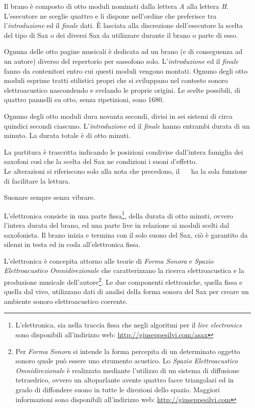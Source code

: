 \documentclass[10pt, a4paper, twoside]{book}
\begin{document}
\begin{multicols}{2}

Il brano è composto di otto moduli nominati dalla lettera \emph{A} alla lettera \emph{H}. L'esecutore ne sceglie quattro e li dispone nell'ordine che preferisce tra l'\emph{introduzione} ed il \emph{finale} dati. È lasciata alla discrezione dell'esecutore la scelta del tipo di Sax o dei diversi Sax da utilizzare durante il brano o parte di esso.

Ognuna delle otto pagine musicali è dedicata ad un brano (e di conseguenza ad un autore) diverso del repertorio per sassofono solo. L'\emph{introduzione} ed il \emph{finale} fanno da contenitori entro cui questi moduli vengono montati. Ognuno degli otto moduli esprime tratti stilistici propri che si sviluppano nel contesto sonoro elettroacustico nascondendo e svelando le proprie origini. Le scelte possibili, di quattro pannelli su otto, senza ripetizioni, sono 1680. 

Ognuno degli otto moduli dura novanta secondi, divisi in sei sistemi di circa quindici secondi ciascuno. L'\emph{introduzione} ed il \emph{finale} hanno entrambi durata di un minuto. La durata totale è di otto minuti.

La partitura è trascritta indicando le posizioni condivise dall'intera famiglia dei saxofoni così che la scelta del Sax ne condizioni i suoni d'effetto. \\
Le alterazioni si riferiscono solo alla nota che precedono, il~ {\large \natural~} ha la sola funzione di facilitare la lettura.

Suonare sempre senza vibrare.

L'elettronica consiste in una parte fissa\footnote{L'elettronica, sia nella traccia fissa che negli algoritmi per il \emph{live electronics} sono disponibili all'indirizzo web: \newline \url{http://giuseppesilvi.com/asax}}, della durata di otto minuti, ovvero l'intera durata del brano, ed una parte live in relazione ai moduli scelti dal saxofonista. Il brano inizia e termina con il solo suono del Sax, ciò è garantito da silenzi in testa ed in coda all'elettronica fissa.

L'elettronica è concepita attorno alle teorie di \emph{Forma Sonora} e \emph{Spazio Elettroacustico Omnidirezionale} che caratterizzano la ricerca elettroacustica e la produzione musicale dell'autore\footnote{Per \emph{Forma Sonora} si intende la forma percepita di un determinato oggetto sonoro quale può essere uno strumento acustico. Lo \emph{Spazio Elettroacustico Omnidirezionale} è realizzato mediante l'utilizzo di un sistema di diffusione tetraedrico, ovvero un altoparlante avente quattro facce triangolari ed in grado di diffondere suono in tutte le direzioni dello spazio. Maggiori informazioni sono disponibili all'indirizzo web: \newline \url{http://giuseppesilvi.com}}. Le due componenti elettroniche, quella fissa e quella dal vivo, utilizzano dati di analisi della forma sonora del Sax per creare un ambiente sonoro elettroacustico coerente. 


\end{multicols}
\end{document}
